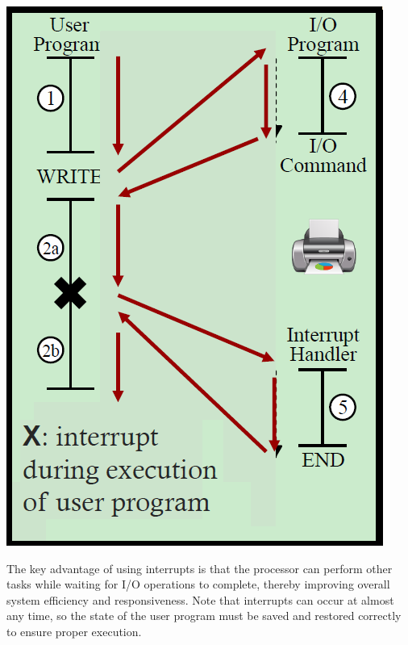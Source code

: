 \documentclass{article}
\begin{document}
\begin{examplebox}
\begin{minipage}{0.65\textwidth}
\end{minipage}%
\hfill
\begin{minipage}{0.32\textwidth}
    \centering
    \includegraphics[width=\linewidth]{figures/CH01Figure4.png} %
    \label{fig:with_interrupts}
\end{minipage}

\vspace {0.5em}

The key advantage of using interrupts is that the processor can perform other tasks while waiting for I/O operations to complete,
thereby improving overall system efficiency and responsiveness.
Note that interrupts can occur at almost any time, so the state of the user program must be saved and restored correctly to ensure proper execution.
\end{examplebox}
\end{document}
